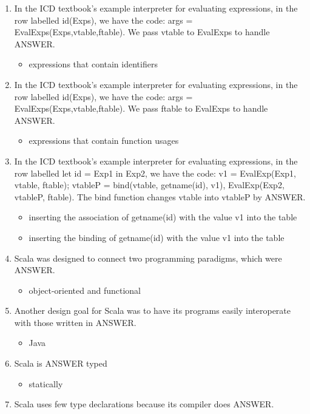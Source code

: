\documentclass{exam}
\begin{document}
\begin{enumerate}
\begin{itemize}
\end{itemize}
\item In the ICD textbook's example interpreter for evaluating expressions, in the row labelled id(Exps), we have the code: args = EvalExps(Exps,vtable,ftable).  We pass vtable to EvalExps to handle ANSWER.
\begin{itemize}
\item expressions that contain identifiers
\end{itemize}
\item In the ICD textbook's example interpreter for evaluating expressions, in the row labelled id(Exps), we have the code: args = EvalExps(Exps,vtable,ftable).  We pass ftable to EvalExps to handle ANSWER.
\begin{itemize}
\item expressions that contain function usages
\end{itemize}
\item In the ICD textbook's example interpreter for evaluating expressions, in the row labelled let id = Exp1 in Exp2, we have the code: v1 = EvalExp(Exp1, vtable, ftable); vtableP = bind(vtable, getname(id), v1), EvalExp(Exp2, vtableP, ftable).  The bind function changes vtable into vtableP by ANSWER.
\begin{itemize}
\item inserting the association of getname(id) with the value v1 into the table
\item inserting the binding of getname(id) with the value v1 into the table
\end{itemize}
\item Scala was designed to connect two programming paradigms, which were ANSWER.
\begin{itemize}
\item object-oriented and functional
\end{itemize}
\item Another design goal for Scala was to have its programs easily interoperate with those written in ANSWER.
\begin{itemize}
\item Java
\end{itemize}
\item Scala is ANSWER typed
\begin{itemize}
\item statically
\end{itemize}
\item Scala uses few type declarations because its compiler does ANSWER.
\begin{itemize}

\end{itemize}
\end{enumerate}
\end{document}
